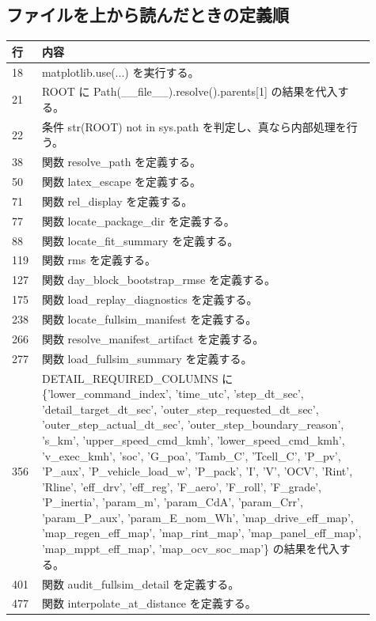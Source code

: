 \documentclass[a4paper,11pt]{article}
\begin{document}
        \subsection{ファイルを上から読んだときの定義順}
            \begin{longtable}{p{0.07\linewidth} p{0.84\linewidth}}
            \toprule
            行 & 内容 \\
            \midrule
            18 & matplotlib.use(...) を実行する。 \\
21 & ROOT に Path(\_\_file\_\_).resolve().parents[1] の結果を代入する。 \\
22 & 条件 str(ROOT) not in sys.path を判定し、真なら内部処理を行う。 \\
38 & 関数 resolve\_path を定義する。 \\
50 & 関数 latex\_escape を定義する。 \\
71 & 関数 rel\_display を定義する。 \\
77 & 関数 locate\_package\_dir を定義する。 \\
88 & 関数 locate\_fit\_summary を定義する。 \\
119 & 関数 rms を定義する。 \\
127 & 関数 day\_block\_bootstrap\_rmse を定義する。 \\
175 & 関数 load\_replay\_diagnostics を定義する。 \\
238 & 関数 locate\_fullsim\_manifest を定義する。 \\
266 & 関数 resolve\_manifest\_artifact を定義する。 \\
277 & 関数 load\_fullsim\_summary を定義する。 \\
356 & DETAIL\_REQUIRED\_COLUMNS に \{'lower\_command\_index', 'time\_utc', 'step\_dt\_sec', 'detail\_target\_dt\_sec', 'outer\_step\_requested\_dt\_sec', 'outer\_step\_actual\_dt\_sec', 'outer\_step\_boundary\_reason', 's\_km', 'upper\_speed\_cmd\_kmh', 'lower\_speed\_cmd\_kmh', 'v\_exec\_kmh', 'soc', 'G\_poa', 'Tamb\_C', 'Tcell\_C', 'P\_pv', 'P\_aux', 'P\_vehicle\_load\_w', 'P\_pack', 'I', 'V', 'OCV', 'Rint', 'Rline', 'eff\_drv', 'eff\_reg', 'F\_aero', 'F\_roll', 'F\_grade', 'P\_inertia', 'param\_m', 'param\_CdA', 'param\_Crr', 'param\_P\_aux', 'param\_E\_nom\_Wh', 'map\_drive\_eff\_map', 'map\_regen\_eff\_map', 'map\_rint\_map', 'map\_panel\_eff\_map', 'map\_mppt\_eff\_map', 'map\_ocv\_soc\_map'\} の結果を代入する。 \\
401 & 関数 audit\_fullsim\_detail を定義する。 \\
477 & 関数 interpolate\_at\_distance を定義する。 \\

\end{longtable}
\end{document}
